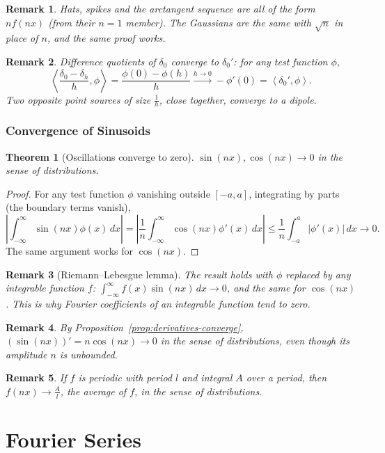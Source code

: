 \documentclass{article}
\newtheorem{theorem}{Theorem}
\newtheorem{remark}{Remark}
\newcommand{\ip}[2]{\left\langle #1, #2 \right\rangle}
\newcommand{\intinf}{\int_{-\infty}^{\infty}}
\begin{document}
\begin{remark}
    Hats, spikes and the arctangent sequence are all of the form $nf(nx)$ (from their $n=1$ member). The Gaussians are the same with $\sqrt{n}$ in place of $n$, and the same proof works.
\end{remark}
\begin{remark}
    Difference quotients of $\delta_0$ converge to $\delta_0'$: for any test function $\phi$,
    \[\ip{\frac{\delta_0-\delta_h}{h}}{\phi} = \frac{\phi(0)-\phi(h)}{h}\xrightarrow{h\to0}-\phi'(0) = \ip{\delta_0'}{\phi}.\]
    Two opposite point sources of size $\frac1h$, close together, converge to a dipole.
\end{remark}

\subsubsection{Convergence of Sinusoids}
\begin{theorem}[Oscillations converge to zero]
    $\sin(nx),\cos(nx) \to 0$ in the sense of distributions.
\end{theorem}
\begin{proof}
    For any test function $\phi$ vanishing outside $[-a,a]$, integrating by parts (the boundary terms vanish),
    \[\left|\intinf\sin(nx)\phi(x)\,dx\right| = \left|\frac{1}{n}\intinf\cos(nx)\phi'(x)\,dx\right| \leq \frac{1}{n}\int_{-a}^{a}|\phi'(x)|\,dx \to 0.\]
    The same argument works for $\cos(nx)$.
\end{proof}
\begin{remark}[Riemann--Lebesgue lemma]
    The result holds with $\phi$ replaced by any integrable function $f$: $\intinf f(x)\sin(nx)\,dx\to0$, and the same for $\cos(nx)$. This is why Fourier coefficients of an integrable function tend to zero.
\end{remark}
\begin{remark}
    By Proposition~\ref{prop:derivatives-converge}, $(\sin(nx))'=n\cos(nx)\to 0$ in the sense of distributions, even though its amplitude $n$ is unbounded.
\end{remark}
\begin{remark}
    If $f$ is periodic with period $l$ and integral $A$ over a period, then $f(nx) \to \frac{A}{l}$, the average of $f$, in the sense of distributions.
\end{remark}

\section{Fourier Series}
\end{document}
